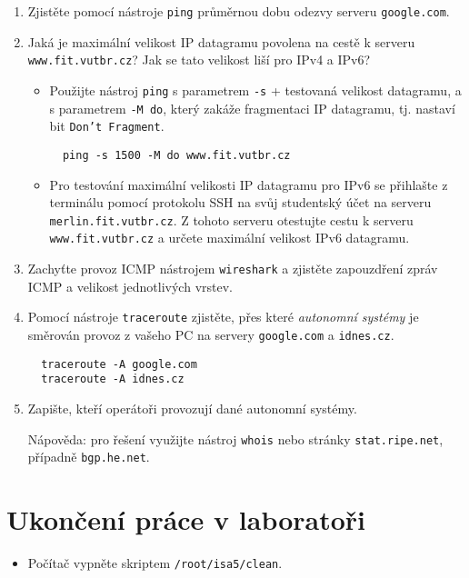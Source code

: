 \begin{enumerate}
  \item Zjistěte pomocí nástroje \texttt{ping} průměrnou dobu odezvy serveru \texttt{google.com}.
  \item Jaká je maximální velikost IP datagramu povolena na cestě k serveru\\ \texttt{www.fit.vutbr.cz}? Jak se tato velikost liší pro IPv4 a IPv6?
  \begin{itemize}
    \item Použijte nástroj {\tt ping} s parametrem \texttt{-s} + testovaná velikost datagramu, a s parametrem \texttt{-M do}, který zakáže fragmentaci IP datagramu, tj. nastaví bit \texttt{Don't Fragment}.
\begin{verbatim}
  ping -s 1500 -M do www.fit.vutbr.cz
\end{verbatim}
\item Pro testování maximální velikosti IP datagramu pro IPv6 se přihlašte z terminálu pomocí protokolu SSH na svůj studentský účet na serveru {\tt merlin.fit.vutbr.cz}. Z tohoto serveru otestujte cestu k serveru \texttt{www.fit.vutbr.cz} a určete maximální velikost IPv6 datagramu. 
  \end{itemize}
  \item Zachyťte provoz ICMP nástrojem {\tt wireshark} a zjistěte zapouzdření zpráv ICMP a velikost jednotlivých vrstev.
  \item Pomocí nástroje \texttt{traceroute} zjistěte, přes které {\em autonomní systémy} je směrován provoz z vašeho PC na servery \texttt{google.com} a \texttt{idnes.cz}.
\begin{verbatim}
  traceroute -A google.com
  traceroute -A idnes.cz
\end{verbatim}
  \item Zapište, kteří operátoři provozují dané autonomní systémy. 

  {\small Nápověda: pro řešení využijte nástroj {\tt whois} nebo stránky \texttt{stat.ripe.net}, případně \texttt{bgp.he.net}.}
\end{enumerate}

\section*{Ukončení práce v laboratoři}
\begin{itemize}
  \item Počítač vypněte skriptem {\tt /root/isa5/clean}.
\end{itemize}
